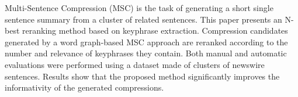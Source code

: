 Multi-Sentence Compression (MSC) is the task of generating a short single sentence summary from a cluster of related sentences. This paper presents an
 N-best reranking method based on keyphrase extraction. Compression candidates
 generated by a word graph-based MSC approach are reranked according to the
 number and relevance of keyphrases they contain. Both manual and automatic
 evaluations were performed using a dataset made of clusters of newswire
 sentences. Results show that the proposed method significantly improves the
 informativity of the generated compressions.

